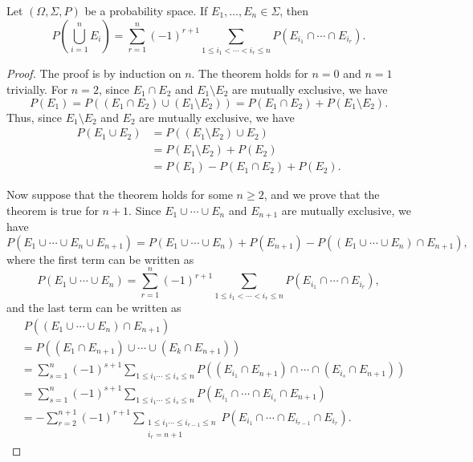 \begin{theorem}\label{thm:addition}
  Let $(\Omega, \Sigma, P)$ be a probability space.
  If $E_1, \dots, E_n \in \Sigma$, then
  \begin{equation*}
    P\left(\bigcup_{i=1}^n E_i\right)
    = \sum_{r=1}^n (-1)^{r+1} \sum_{1 \leq i_1 < \cdots < i_r \leq n}
      P(E_{i_1} \cap \cdots \cap E_{i_r}).
  \end{equation*}
\end{theorem}
\begin{proof}
  The proof is by induction on $n$.
  The theorem holds for $n = 0$ and $n = 1$ trivially.
  For $n = 2$, since $E_1 \cap E_2$ and $E_1 \setminus E_2$ are mutually
  exclusive, we have
  \begin{equation*}
    P(E_1) = P((E_1 \cap E_2) \cup (E_1 \setminus E_2))
           = P(E_1 \cap E_2) + P(E_1 \setminus E_2).
  \end{equation*}
  Thus, since $E_1 \setminus E_2$ and $E_2$ are mutually exclusive, we have
  \begin{align*}
    P(E_1 \cup E_2)
    &= P((E_1 \setminus E_2) \cup E_2) \\
    &= P(E_1 \setminus E_2) + P(E_2) \\
    &= P(E_1) - P(E_1 \cap E_2) + P(E_2).
  \end{align*}

  Now suppose that the theorem holds for some $n \geq 2$, and we prove that
  the theorem is true for $n + 1$.
  Since $E_1 \cup \cdots \cup E_n$ and $E_{n+1}$ are mutually exclusive, we
  have
  \begin{equation*}
    P(E_1 \cup \cdots \cup E_n \cup E_{n+1})
    = P(E_1 \cup \cdots \cup E_n) + P(E_{n+1})
      - P((E_1 \cup \cdots \cup E_n) \cap E_{n+1}),
  \end{equation*}
  where the first term can be written as
  \begin{equation*}
    P(E_1 \cup \cdots \cup E_n)
    = \sum_{r=1}^n (-1)^{r+1} \sum_{1 \leq i_1 < \cdots < i_r \leq n}
      P(E_{i_1} \cap \cdots \cap E_{i_r}),
  \end{equation*}
  and the last term can be written as
  \begin{align*}
    &\;P((E_1 \cup \cdots \cup E_n) \cap E_{n+1}) \\
    &= P((E_1 \cap E_{n+1}) \cup \cdots \cup (E_k \cap E_{n+1})) \\
    &= \sum_{s=1}^n (-1)^{s+1} \sum_{1 \leq i_1 \cdots \leq i_s \leq n}
       P((E_{i_1} \cap E_{n+1}) \cap \cdots \cap (E_{i_s} \cap E_{n+1})) \\
    &= \sum_{s=1}^n (-1)^{s+1} \sum_{1 \leq i_1 \cdots \leq i_s \leq n}
       P(E_{i_1} \cap \cdots \cap E_{i_s} \cap E_{n+1}) \\
    &= -\sum_{r=2}^{n+1} (-1)^{r+1}
       \sum_{\substack{1 \leq i_1 \cdots \leq i_{r-1} \leq n \\ i_r = n+1}}
       P(E_{i_1} \cap \cdots \cap E_{i_{r-1}} \cap E_{i_r}).
  \end{align*}
  

\end{proof}
